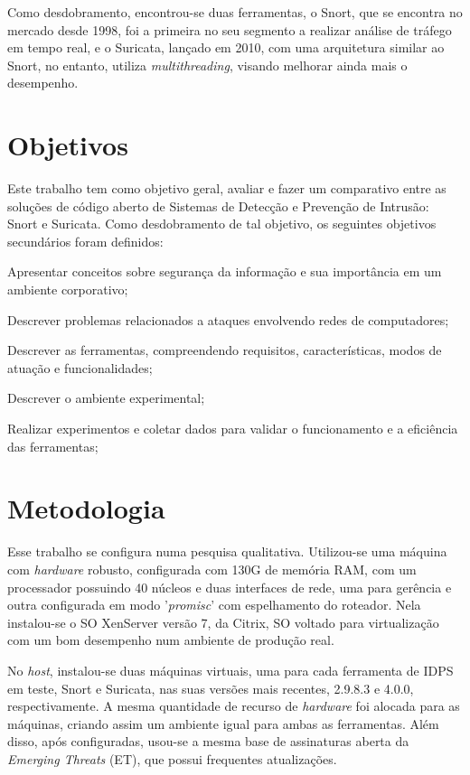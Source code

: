 Como desdobramento, encontrou-se duas ferramentas, o Snort, que se encontra no mercado desde 1998, foi a primeira no seu segmento a realizar análise de tráfego em tempo real, e o Suricata, lançado em 2010, com uma arquitetura similar ao Snort, no entanto, utiliza \textit{multithreading}, visando melhorar ainda mais o desempenho.

\section{Objetivos} \label{sec:objetivos}

Este trabalho tem como objetivo geral, avaliar e fazer um comparativo entre as soluções de código aberto de Sistemas de Detecção e Prevenção de Intrusão: Snort e Suricata. Como desdobramento de tal objetivo, os seguintes objetivos secundários foram definidos:

\begin{alineas}
\item Apresentar conceitos sobre segurança da informação e sua importância em um ambiente corporativo;
\item Descrever problemas relacionados a ataques envolvendo redes de computadores;
\item Descrever as ferramentas, compreendendo requisitos, características, modos de atuação e funcionalidades;
\item Descrever o ambiente experimental;
\item Realizar experimentos e coletar dados para validar o funcionamento e a eficiência das ferramentas;
\end{alineas}

\section{Metodologia} \label{sec:metodologia}

Esse trabalho se configura numa pesquisa qualitativa. Utilizou-se uma máquina com \textit{hardware} robusto, configurada com 130G de memória RAM, com um processador possuindo 40 núcleos e duas interfaces de rede, uma para gerência e outra configurada em modo '\textit{promisc}' com espelhamento do roteador. Nela instalou-se o SO XenServer versão 7, da Citrix, SO voltado para virtualização com um bom desempenho num ambiente de produção real. 

No \textit{host}, instalou-se duas máquinas virtuais, uma para cada ferramenta de IDPS em teste, Snort e Suricata, nas suas versões mais recentes, 2.9.8.3 e 4.0.0, respectivamente. A mesma quantidade de recurso de \textit{hardware} foi alocada para as máquinas, criando assim um ambiente igual para ambas as ferramentas. Além disso, após configuradas, usou-se a mesma base de assinaturas aberta da \textit{Emerging Threats} (ET), que possui frequentes atualizações.

